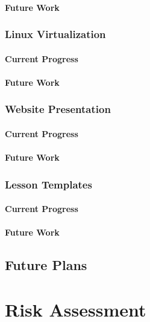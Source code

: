\documentclass[openright]{report}
\begin{document}
\subsubsection{Future Work}

\subsection{Linux Virtualization}

\subsubsection{Current Progress}

\subsubsection{Future Work}

\subsection{Website Presentation}

\subsubsection{Current Progress}

\subsubsection{Future Work}

\subsection{Lesson Templates}

\subsubsection{Current Progress}

\subsubsection{Future Work}

\section{Future Plans}

\chapter{Risk Assessment}
\end{document}
